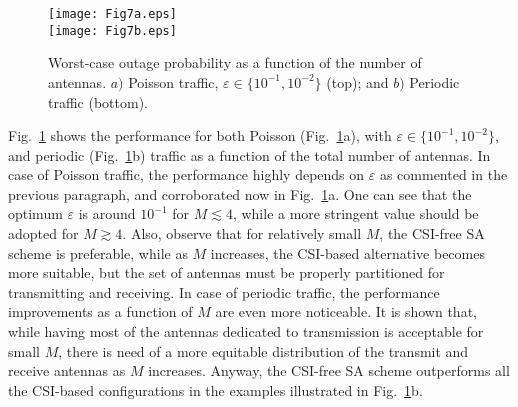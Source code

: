 \documentclass[10pt,journal,a4paper]{IEEEtran}
\begin{document}
	\begin{figure}[t!]
		\texttt{[image: Fig7a.eps]}\vspace{3mm}\\
		\texttt{[image: Fig7b.eps]}
		\caption{Worst-case outage probability as a function of the number of antennas. $a)$ Poisson traffic, $\varepsilon\in \{10^{-1}, 10^{-2}\}$ (top); and $b)$ Periodic traffic (bottom).}	
		\label{Fig7}
	\end{figure}
	Fig.~\ref{Fig7} shows the performance for both Poisson (Fig.~\ref{Fig7}a), with $\varepsilon\in\{10^{-1},10^{-2}\}$, and periodic (Fig.~\ref{Fig7}b) traffic as a function of the total number of antennas.  In case of Poisson traffic, the performance highly depends on $\varepsilon$ as commented in the previous paragraph, and corroborated now in Fig.~\ref{Fig7}a. One can see that the optimum $\varepsilon$ is around $10^{-1}$ for $M\lesssim 4$, while a more stringent value should be adopted for $M\gtrsim 4$. Also, observe that for relatively small $M$, the CSI-free SA scheme is preferable, while as $M$ increases, the CSI-based alternative becomes more suitable, but the set of antennas must be properly partitioned for transmitting and receiving. In case of periodic traffic, the performance improvements as a function of $M$ are even more noticeable. It is shown that, while having most of the antennas dedicated to transmission is acceptable for small $M$, there is need of a more equitable distribution of the transmit and receive antennas as $M$ increases. Anyway, the CSI-free SA scheme outperforms all the CSI-based configurations in the examples illustrated in Fig.~\ref{Fig7}b.
	
\end{document}
